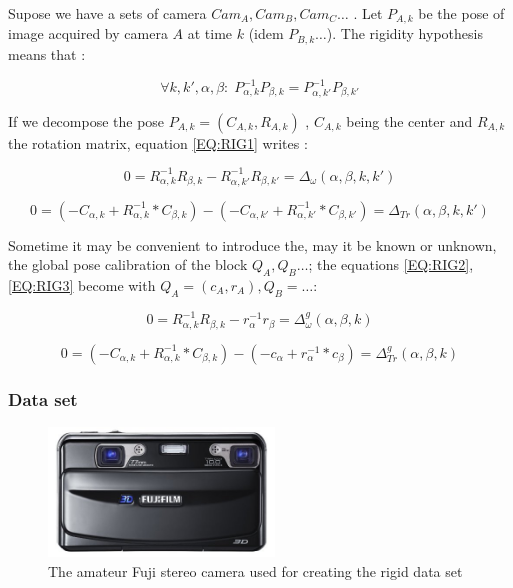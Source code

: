 Supose we have a sets of camera $Cam_A,Cam_B,Cam_C \dots $ . Let $P_{A,k}$ be the pose of image acquired by camera $A$
at time $k$ (idem $P_{B,k} \dots$).  The rigidity hypothesis means that :


\begin{equation}
     \forall k,k',\alpha,\beta  : \;
     P_{\alpha,k}^{-1} P_{\beta,k} =  P_{\alpha,k'}^{-1} P_{\beta,k'}
     \label{EQ:RIG1}
\end{equation}

If we decompose the pose  $P_{A,k} = (C_{A,k},R_{A,k})$ , $C_{A,k}$ being the center 
and $R_{A,k}$ the rotation matrix, equation \ref{EQ:RIG1}  writes :

\begin{equation}
     0 = R_{\alpha,k}^{-1} R_{\beta,k} -  R_{\alpha,k'}^{-1} R_{\beta,k'}
      = \Delta_{\omega}(\alpha,\beta,k,k')
     \label{EQ:RIG2}
\end{equation}

\begin{equation}
     0 = (- C_{\alpha,k}  + R_{\alpha,k}^{-1} * C_{\beta,k}) -(- C_{\alpha,k'}  + R_{\alpha,k'}^{-1} * C_{\beta,k'})
      = \Delta_{Tr}(\alpha,\beta,k,k')
     \label{EQ:RIG3}
\end{equation}

Sometime it may be convenient to introduce the, may it be known or unknown, 
the global pose calibration of the block $Q_A,Q_B \dots$; the
equations \ref{EQ:RIG2}, \ref{EQ:RIG3} become  with  $Q_A=(c_A,r_A), Q_B= \dots $:

\begin{equation}
     0 = R_{\alpha,k}^{-1} R_{\beta,k} -  r_{\alpha}^{-1} r_{\beta}
      = \Delta^g_{\omega}(\alpha,\beta,k)
     \label{EQ:RIG4}
\end{equation}

\begin{equation}
     0 = (- C_{\alpha,k}  + R_{\alpha,k}^{-1} * C_{\beta,k}) -(- c_{\alpha}  + r_{\alpha}^{-1} * c_{\beta})
      = \Delta^g_{Tr}(\alpha,\beta,k)
     \label{EQ:RIG5}
\end{equation}


\subsubsection{Data set}

\begin{figure}
\begin{center}
   \includegraphics[width=60mm]{NEW-DATA/Rigid-Block/Fuji.jpg}
\end{center}
\caption{The amateur Fuji stereo camera used for  creating the rigid data set}
\label{ImFuji}
\end{figure}


